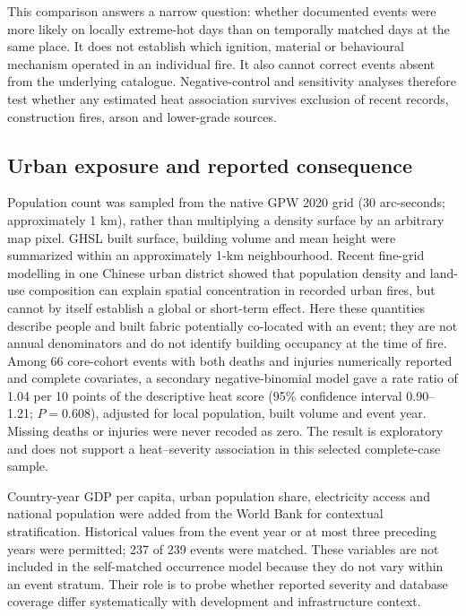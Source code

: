 \documentclass[11pt]{article}
\begin{document}
This comparison answers a narrow question: whether documented events were more likely on locally extreme-hot days than on temporally matched days at the same place. It does not establish which ignition, material or behavioural mechanism operated in an individual fire. It also cannot correct events absent from the underlying catalogue. Negative-control and sensitivity analyses therefore test whether any estimated heat association survives exclusion of recent records, construction fires, arson and lower-grade sources.

\subsection*{Urban exposure and reported consequence}
Population count was sampled from the native GPW 2020 grid (30 arc-seconds; approximately 1 km), rather than multiplying a density surface by an arbitrary map pixel. GHSL built surface, building volume and mean height were summarized within an approximately 1-km neighbourhood. Recent fine-grid modelling in one Chinese urban district showed that population density and land-use composition can explain spatial concentration in recorded urban fires, but cannot by itself establish a global or short-term effect\citep{Wu2026}. Here these quantities describe people and built fabric potentially co-located with an event; they are not annual denominators and do not identify building occupancy at the time of fire. Among 66 core-cohort events with both deaths and injuries numerically reported and complete covariates, a secondary negative-binomial model gave a rate ratio of 1.04 per 10 points of the descriptive heat score (95\% confidence interval 0.90--1.21; $P=0.608$), adjusted for local population, built volume and event year. Missing deaths or injuries were never recoded as zero. The result is exploratory and does not support a heat--severity association in this selected complete-case sample.

Country-year GDP per capita, urban population share, electricity access and national population were added from the World Bank for contextual stratification. Historical values from the event year or at most three preceding years were permitted; 237 of 239 events were matched. These variables are not included in the self-matched occurrence model because they do not vary within an event stratum. Their role is to probe whether reported severity and database coverage differ systematically with development and infrastructure context.
\end{document}
